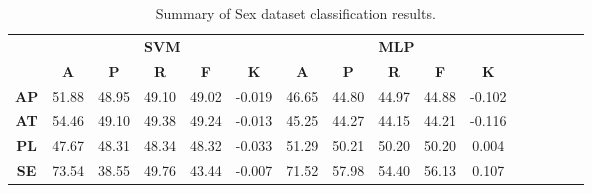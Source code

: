 \begin{landscape}
\begin{table}[htbp]
\footnotesize
\centering
\caption{Summary of Sex dataset classification results.}
\label{tab:base_female}
\begin{tabular}{|c|c|c|c|c|c|c|c|c|c|c|c|c|c|c|c|}
\hline
\multirow{2}{*}{}	& \multicolumn{5}{c|}{\textbf{SVM}}												& \multicolumn{5}{c|}{\textbf{MLP}}												\\ \cline{2-11} 
					& \textbf{A}	& \textbf{P}	& \textbf{R}	& \textbf{F}	& \textbf{K}	& \textbf{A}	& \textbf{P}	& \textbf{R}	& \textbf{F}	& \textbf{K}	\\ \hline
\textbf{AP}			& 51.88			& 48.95			& 49.10			& 49.02			& -0.019			& 46.65			& 44.80			& 44.97			& 44.88			& -0.102			\\ \hline
\textbf{AT}			& 54.46			& 49.10			& 49.38			& 49.24			& -0.013			& 45.25			& 44.27			& 44.15			& 44.21			& -0.116			\\ \hline
\textbf{PL}			& 47.67			& 48.31			& 48.34			& 48.32			& -0.033			& 51.29			& 50.21			& 50.20			& 50.20			& 0.004			\\ \hline
\textbf{SE}			& 73.54			& 38.55			& 49.76			& 43.44			& -0.007			& 71.52			& 57.98			& 54.40			& 56.13			& 0.107			\\ \hline
\end{tabular}
\end{table}
\end{landscape}